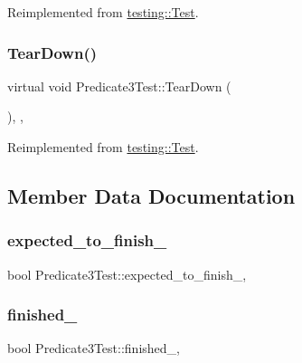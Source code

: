 Reimplemented from \mbox{\hyperlink{classtesting_1_1_test_a5f0ab439802cbe0ef7552f1a9f791923}{testing\+::\+Test}}.

\mbox{\label{class_predicate3_test_aa4dc395bded849b6e5175566d791aba7}} 
\subsubsection{\texorpdfstring{TearDown()}{TearDown()}\hspace{0.1cm}{\footnotesize\ttfamily [3/3]}}
{\footnotesize\ttfamily virtual void Predicate3\+Test\+::\+Tear\+Down (\begin{DoxyParamCaption}{ }\end{DoxyParamCaption})\hspace{0.3cm}{\ttfamily [inline]}, {\ttfamily [protected]}, {\ttfamily [virtual]}}



Reimplemented from \mbox{\hyperlink{classtesting_1_1_test_a5f0ab439802cbe0ef7552f1a9f791923}{testing\+::\+Test}}.



\subsection{Member Data Documentation}
\mbox{\label{class_predicate3_test_a42c11555410ee89bf6e59d39336a212c}} 
\subsubsection{\texorpdfstring{expected\_to\_finish\_}{expected\_to\_finish\_}}
{\footnotesize\ttfamily bool Predicate3\+Test\+::expected\+\_\+to\+\_\+finish\+\_\+\hspace{0.3cm}{\ttfamily [static]}, {\ttfamily [protected]}}

\mbox{\label{class_predicate3_test_aa2ef0fa6aed09d872fb9ae36961b49eb}} 
\subsubsection{\texorpdfstring{finished\_}{finished\_}}
{\footnotesize\ttfamily bool Predicate3\+Test\+::finished\+\_\+\hspace{0.3cm}{\ttfamily [static]}, {\ttfamily [protected]}}

